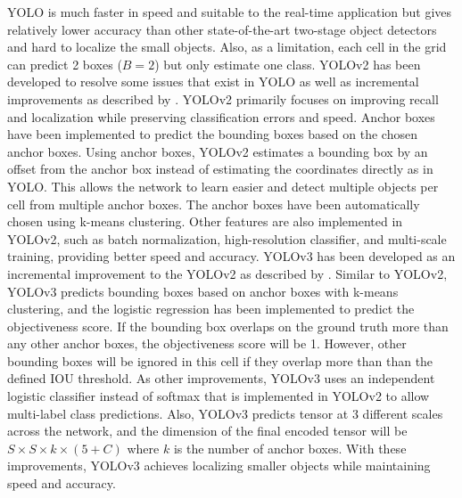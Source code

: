 YOLO is much faster in speed and suitable to the real-time application but gives relatively lower accuracy than other state-of-the-art two-stage object detectors and hard to localize the small objects. Also, as a limitation, each cell in the grid can predict 2 boxes ($B=2$) but only estimate one class. YOLOv2 has been developed to resolve some issues that exist in YOLO as well as incremental improvements as described by \citeauthor{redmon_yolo9000_2017} \cite{redmon_yolo9000_2017}. YOLOv2 primarily focuses on improving recall and localization while preserving classification errors and speed. Anchor boxes have been implemented to predict the bounding boxes based on the chosen anchor boxes. Using anchor boxes, YOLOv2 estimates a bounding box by an offset from the anchor box instead of estimating the coordinates directly as in YOLO. This allows the network to learn easier and detect multiple objects per cell from multiple anchor boxes. The anchor boxes have been automatically chosen using k-means clustering. Other features are also implemented in YOLOv2, such as batch normalization, high-resolution classifier, and multi-scale training, providing better speed and accuracy. YOLOv3 has been developed as an incremental improvement to the YOLOv2 as described by \citeauthor{redmon_yolov3_2018} \cite{redmon_yolov3_2018}. Similar to YOLOv2, YOLOv3 predicts bounding boxes based on anchor boxes with k-means clustering, and the logistic regression has been implemented to predict the objectiveness score. If the bounding box overlaps on the ground truth more than any other anchor boxes, the objectiveness score will be 1. However, other bounding boxes will be ignored in this cell if they overlap more than than the defined IOU threshold. As other improvements, YOLOv3 uses an independent logistic classifier instead of softmax that is implemented in YOLOv2 to allow multi-label class predictions. Also, YOLOv3 predicts tensor at 3 different scales across the network, and the dimension of the final encoded tensor will be $S \times S \times k \times (5 + C)$ where $k$ is the number of anchor boxes. With these improvements, YOLOv3 achieves localizing smaller objects while maintaining speed and accuracy.

